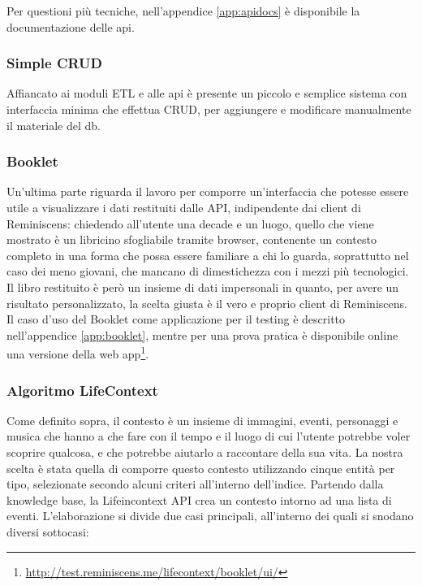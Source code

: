 \documentclass[sigproc-sp.tex]{subfiles}
\begin{document}
Per questioni più tecniche, nell'appendice \ref{app:apidocs} è disponibile la documentazione delle api.

\subsubsection{Simple CRUD}
Affiancato ai moduli ETL e alle api è presente un piccolo e semplice sistema con interfaccia minima che effettua CRUD, per aggiungere e modificare manualmente il materiale del db.

\subsubsection{Booklet}
\label{subsubsec:booklet}
Un’ultima parte riguarda il lavoro per comporre un’interfaccia che potesse essere utile a visualizzare i dati restituiti dalle API, indipendente dai client di Reminiscens: chiedendo all’utente una decade e un luogo, quello che viene mostrato è un libricino sfogliabile tramite browser, contenente un contesto completo in una forma che possa essere familiare a chi lo guarda, soprattutto nel caso dei meno giovani, che mancano di dimestichezza con i mezzi più tecnologici. Il libro restituito è però un insieme di dati impersonali in quanto, per avere un risultato personalizzato, la scelta giusta è il vero e proprio client di Reminiscens. Il caso d'uso del Booklet come applicazione per il testing è descritto nell'appendice \ref{app:booklet}, mentre per una prova pratica è disponibile online una versione della web app\footnote{\url{http://test.reminiscens.me/lifecontext/booklet/ui/}}.

\subsubsection{Algoritmo LifeContext}
\label{subsubsec:lifecontext}
Come definito sopra, il contesto è un insieme di immagini, eventi, personaggi e musica che hanno a che fare con il tempo e il luogo di cui l’utente potrebbe voler scoprire qualcosa, e che potrebbe aiutarlo a raccontare della sua vita. La nostra scelta è stata quella di comporre questo contesto utilizzando cinque entità per tipo, selezionate secondo alcuni criteri all’interno dell’indice.
Partendo dalla knowledge base, la Lifeincontext API crea un contesto intorno ad una lista di eventi. L’elaborazione si divide due casi principali, all’interno dei quali si snodano diversi sottocasi:
\end{document}
